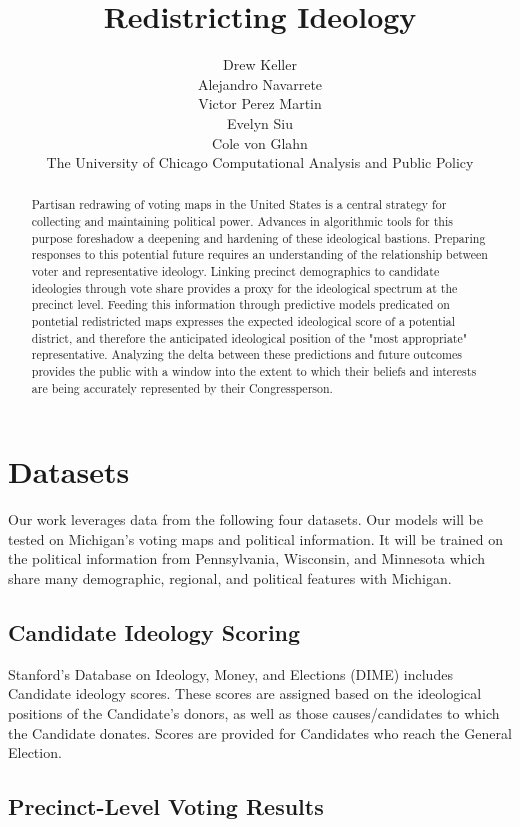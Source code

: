 \documentclass{article}
\title{Redistricting Ideology}
\author{
  Drew Keller \\
  Alejandro Navarrete \\
  Victor Perez Martin \\
  Evelyn Siu \\
  Cole von Glahn \\
  The University of Chicago
  Computational Analysis and Public Policy
}
\begin{document}
\maketitle


\begin{abstract}
  Partisan redrawing of voting maps in the United States is a central strategy for collecting and 
  maintaining political power. Advances in algorithmic tools for this purpose foreshadow a 
  deepening and hardening of these ideological bastions. Preparing responses to this potential
  future requires an understanding of the relationship between voter and representative ideology.
  Linking precinct demographics to candidate ideologies through vote share provides a proxy for the 
  ideological spectrum at the precinct level. Feeding this information through predictive models
  predicated on pontetial redistricted maps expresses the expected ideological score of a potential
  district, and therefore the anticipated ideological position of the "most appropriate" representative.
  Analyzing the delta between these predictions and future outcomes provides the public with a window 
  into the extent to which their beliefs and interests are being accurately represented by their
  Congressperson.
\end{abstract}


\section{Datasets}


Our work leverages data from the following four datasets. Our models will be
tested on Michigan's voting maps and political information. It will be trained
on the political information from Pennsylvania, Wisconsin, and Minnesota which
share many demographic, regional, and political features with Michigan. 

\subsection{Candidate Ideology Scoring}


Stanford's Database on Ideology, Money, and Elections (DIME) includes
Candidate ideology scores. These scores are assigned based on
the ideological positions of the Candidate's donors, as well as those
causes/candidates to which the Candidate donates. Scores are provided
for Candidates who reach the General Election.


\subsection{Precinct-Level Voting Results}
\end{document}
